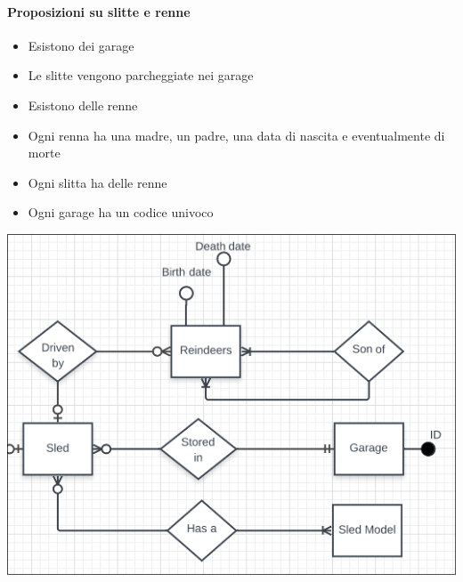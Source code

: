 \documentclass[12pt]{report}
\begin{document}
\paragraph{Proposizioni su slitte e renne}
\begin{itemize}
  \item Esistono dei garage
  \item Le slitte vengono parcheggiate nei garage
  \item Esistono delle renne
  \item Ogni renna ha una madre, un padre, una data di nascita e eventualmente di morte
  \item Ogni slitta ha delle renne
  \item Ogni garage ha un codice univoco
\end{itemize}
\begin{center}
\includegraphics[scale=0.60]{er2.png}
\end{center}
\end{document}
